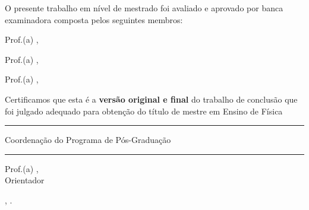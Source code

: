 
\begin{center}
    \textbf{\autor}
\end{center}

\vspace{0.5cm}

\begin{center}	
	\textbf{\titulo}\subtitulo
\end{center}
\vspace{0.5cm}
\begin{center}

O presente trabalho em nível de mestrado foi avaliado e aprovado por banca examinadora composta pelos seguintes membros:
\vspace{0.5cm}

Prof.(a) \orientador, \\
\instituicao
\vspace{0.5cm}


Prof.(a) \membroInterno, \\
\instituicao
\vspace{0.5cm}


Prof.(a) \membroExterno, \\
\instituicaoExterno
\vspace{0.5cm}



Certificamos que esta é a \textbf{versão original e final} do trabalho de conclusão que foi julgado adequado para obtenção do título de mestre em Ensino de Física

\end{center} 

\vspace{1.cm}

\begin{center}
    
    \rule{9cm}{1pt} %
    
	Coordenação do Programa de Pós-Graduação
    
    
    \vspace{1.5cm}
    
    \rule{9cm}{1pt} %
    
    Prof.(a) \orientador, \\
    Orientador
    
  
\end{center}



\vfill

\vspace{1.0cm}

\begin{center}
	\cidade , \ano.
\end{center}

\setcounter{page}{3} %
\newpage